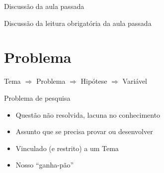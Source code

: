 \documentclass{beamer}
\begin{document}

\begin{frame}{Discussão da aula passada}
  \begin{block}{}
    Discussão da leitura obrigatória da aula passada
  \end{block}
\end{frame}

\section{Problema}

\begin{frame}
  \begin{center}
    Tema $\Rightarrow$ Problema $\Rightarrow$ Hipótese $\Rightarrow$ Variável

    \bigskip
  \end{center}
\end{frame}

\begin{frame}{Problema de pesquisa}
  \begin{itemize}
    \footnotesize
  \item Questão não resolvida, lacuna no conhecimento
    \bigskip
  \item Assunto que se precisa provar ou desenvolver
    \bigskip
  \item Vinculado (e restrito) a um Tema
    \bigskip
  \item Nosso ``ganha-pão''
  \end{itemize}
\end{frame}
\end{document}
